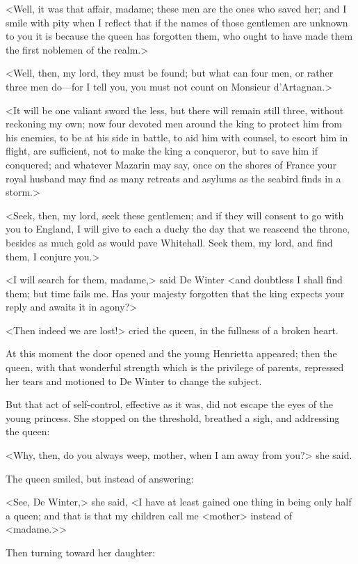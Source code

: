 <Well, it was that affair, madame; these men are the ones who saved her; and I smile with pity when I reflect that if the names of those gentlemen are unknown to you it is because the queen has forgotten them, who ought to have made them the first noblemen of the realm.>

<Well, then, my lord, they must be found; but what can four men, or rather three men do—for I tell you, you must not count on Monsieur d'Artagnan.>

<It will be one valiant sword the less, but there will remain still three, without reckoning my own; now four devoted men around the king to protect him from his enemies, to be at his side in battle, to aid him with counsel, to escort him in flight, are sufficient, not to make the king a conqueror, but to save him if conquered; and whatever Mazarin may say, once on the shores of France your royal husband may find as many retreats and asylums as the seabird finds in a storm.>

<Seek, then, my lord, seek these gentlemen; and if they will consent to go with you to England, I will give to each a duchy the day that we reascend the throne, besides as much gold as would pave Whitehall. Seek them, my lord, and find them, I conjure you.>

<I will search for them, madame,> said De Winter <and doubtless I shall find them; but time fails me. Has your majesty forgotten that the king expects your reply and awaits it in agony?>

<Then indeed we are lost!> cried the queen, in the fullness of a broken heart.

At this moment the door opened and the young Henrietta appeared; then the queen, with that wonderful strength which is the privilege of parents, repressed her tears and motioned to De Winter to change the subject.

But that act of self-control, effective as it was, did not escape the eyes of the young princess. She stopped on the threshold, breathed a sigh, and addressing the queen:

<Why, then, do you always weep, mother, when I am away from you?> she said.

The queen smiled, but instead of answering:

<See, De Winter,> she said, <I have at least gained one thing in being only half a queen; and that is that my children call me <mother> instead of <madame.>>

Then turning toward her daughter:

